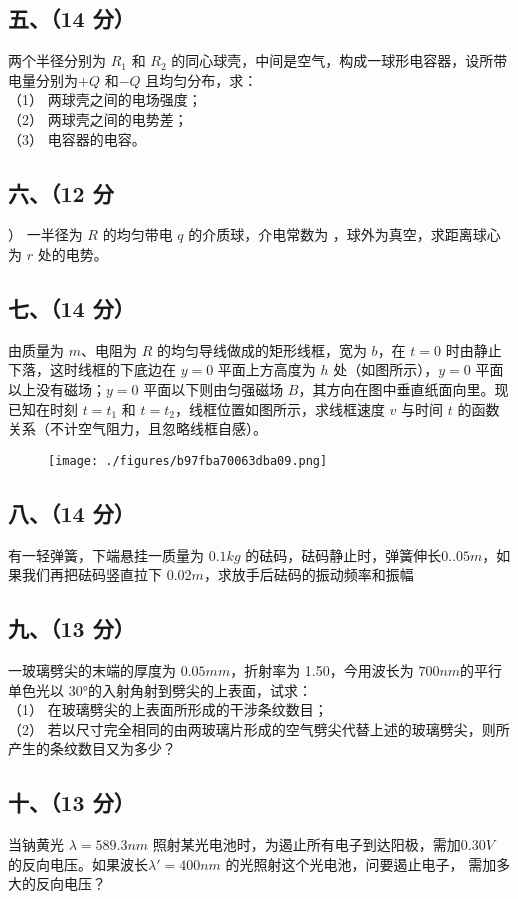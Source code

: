 \subsection{五、（14 分）}
两个半径分别为 $R_1$ 和 $R_2$ 的同心球壳，中间是空气，构成一球形电容器，设所带电量分别为$+Q$ 和$-Q$ 且均匀分布，求：\\
（1） 两球壳之间的电场强度；\\
（2） 两球壳之间的电势差；\\
（3） 电容器的电容。
\subsection{六、（12 分}）
一半径为 $R$ 的均匀带电 $q$ 的介质球，介电常数为 ，球外为真空，求距离球心为 $r$ 处的电势。
\subsection{七、（14 分）}
由质量为 $m$、电阻为 $R$ 的均匀导线做成的矩形线框，宽为 $b$，在 $t=0$ 时由静止下落，这时线框的下底边在 $y=0$ 平面上方高度为 $h$ 处（如图所示），$y=0$ 平面以上没有磁场；$y=0$ 平面以下则由匀强磁场 $B$，其方向在图中垂直纸面向里。现已知在时刻 $t=t_1$ 和 $t=t_2$，线框位置如图所示，求线框速度 $v$ 与时间 $t$ 的函数关系（不计空气阻力，且忽略线框自感）。
\begin{figure}[ht]
\centering
\texttt{[image: ./figures/b97fba70063dba09.png]}
\caption{} \label{fig_NJUD5_6}
\end{figure}
\subsection{八、（14 分）}
有一轻弹簧，下端悬挂一质量为 $0.1kg$ 的砝码，砝码静止时，弹簧伸长$0..05m$，如果我们再把砝码竖直拉下 $0.02m$，求放手后砝码的振动频率和振幅
\subsection{九、（13 分）}
一玻璃劈尖的末端的厚度为 $0.05mm$，折射率为 1.50，今用波长为 $700nm$的平行单色光以 30°的入射角射到劈尖的上表面，试求：\\
（1） 在玻璃劈尖的上表面所形成的干涉条纹数目；\\
（2） 若以尺寸完全相同的由两玻璃片形成的空气劈尖代替上述的玻璃劈尖，则所产生的条纹数目又为多少？
\subsection{十、（13 分）}
当钠黄光 $\lambda=589.3nm$ 照射某光电池时，为遏止所有电子到达阳极，需加$0.30V$ 的反向电压。如果波长$\lambda' =400nm$ 的光照射这个光电池，问要遏止电子，
需加多大的反向电压？
